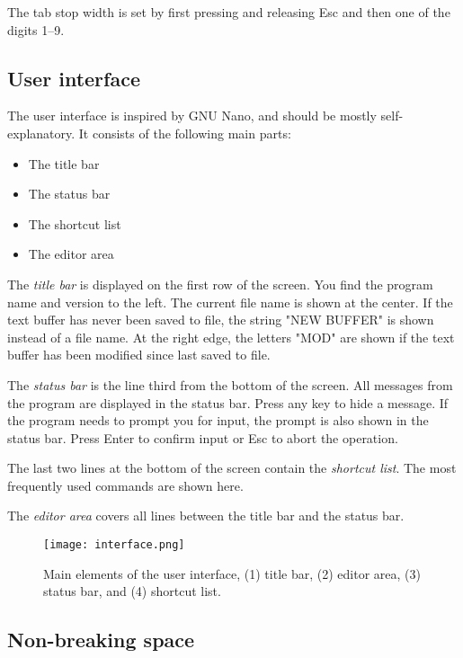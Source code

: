 \documentclass{article}
\begin{document}
        \noindent The tab stop width is set by first pressing and releasing Esc and then one of the digits 1--9.

    \subsection{User interface}
	
	The user interface is inspired by GNU Nano, and should be mostly self-explanatory. It consists of the following main parts:
	
	\begin{itemize}
		\item The title bar
		\item The status bar
		\item The shortcut list
		\item The editor area
	\end{itemize}
	
	\noindent The \textit{title bar} is displayed on the first row of the screen. You find the program name and version to the left. 
	The current file name is shown at the center. If the text buffer has never been saved to file, the string "NEW BUFFER" is
	shown instead of a file name. At the right edge, the letters "MOD" are shown if the text buffer has been modified
	since last saved to file.
	
	The \textit{status bar} is the line third from the bottom of the screen. All messages from the program are displayed in
	the status bar. Press any key to hide a message. If the program needs to prompt you for input, the prompt is also shown in the status bar. 
	Press Enter to confirm input or Esc to abort the operation.
	
	The last two lines at the bottom of the screen contain the \textit{shortcut list}. The most frequently used commands are
	shown here.
	
	The \textit{editor area} covers all lines between the title bar and the status bar. 

    \begin{figure}[H]
        \caption{Main elements of the user interface, (1) title bar, (2) editor area, (3) status bar, and (4) shortcut list.}
        \centering\texttt{[image: interface.png]}
    \end{figure}
	
	\subsection{Non-breaking space}
\end{document}
